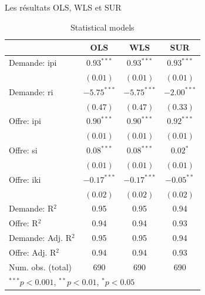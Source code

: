 \documentclass[11pt,ignorenonframetext,]{beamer}
\begin{document}
\begin{frame}{Les résultats OLS, WLS et SUR}
\protect\hypertarget{les-resultats-ols-wls-et-sur}{}

\tiny

\begin{table}
\begin{center}
\begin{tabular}{l c c c }
\hline
 & OLS & WLS & SUR \\
\hline
Demande: ipi        & $0.93^{***}$  & $0.93^{***}$  & $0.93^{***}$  \\
                    & $(0.01)$      & $(0.01)$      & $(0.01)$      \\
Demande: ri         & $-5.75^{***}$ & $-5.75^{***}$ & $-2.00^{***}$ \\
                    & $(0.47)$      & $(0.47)$      & $(0.33)$      \\
Offre: ipi          & $0.90^{***}$  & $0.90^{***}$  & $0.92^{***}$  \\
                    & $(0.01)$      & $(0.01)$      & $(0.01)$      \\
Offre: si           & $0.08^{***}$  & $0.08^{***}$  & $0.02^{*}$    \\
                    & $(0.01)$      & $(0.01)$      & $(0.01)$      \\
Offre: iki          & $-0.17^{***}$ & $-0.17^{***}$ & $-0.05^{**}$  \\
                    & $(0.02)$      & $(0.02)$      & $(0.02)$      \\
\hline
Demande: R$^2$      & 0.95          & 0.95          & 0.94          \\
Offre: R$^2$        & 0.94          & 0.94          & 0.93          \\
Demande: Adj. R$^2$ & 0.95          & 0.95          & 0.94          \\
Offre: Adj. R$^2$   & 0.94          & 0.94          & 0.93          \\
Num. obs. (total)   & 690           & 690           & 690           \\
\hline
\multicolumn{4}{l}{\scriptsize{$^{***}p<0.001$, $^{**}p<0.01$, $^*p<0.05$}}
\end{tabular}
\caption{Statistical models}
\label{table : ols, wls and sur}
\end{center}
\end{table}
\tiny

\end{frame}
\end{document}
